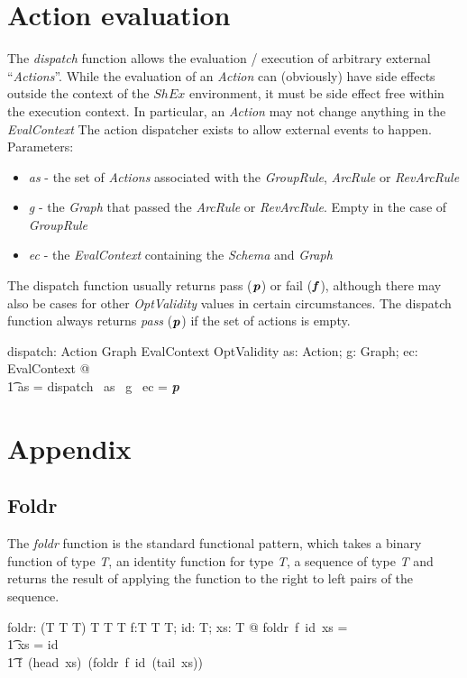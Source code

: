 \documentclass[fuzz]{llncs}
\def\pass{\textbf{\textit{p}}}
\def\fail{\textbf{\textit{f}}}
\def\zc{\textit}
\begin{document}
\section{Action evaluation}
The \zc{dispatch} function allows the evaluation / execution of arbitrary external ``\zc{Actions}''.  While the evaluation of an \zc{Action} can (obviously) have side effects
outside the context of the $ShEx$ environment, it must be side effect free within the 
execution context.  In particular, an \zc{Action} may not change anything in the 
\zc{EvalContext} 
The action dispatcher exists to allow external events to happen. Parameters:
\begin{itemize}
\item \zc{as} - the set of \zc{Actions} associated with the \zc{GroupRule}, \zc{ArcRule} or \zc{RevArcRule} 
\item \zc{g} - the \zc{Graph} that passed the \zc{ArcRule} or \zc{RevArcRule}.  Empty in the case of \zc{GroupRule}
\item \zc{ec} - the \zc{EvalContext} containing the \zc{Schema} and \zc{Graph}

\end{itemize}

The dispatch function usually returns pass ($\pass$) or fail ($\fail$), although there may also be cases for other \zc{OptValidity} values in certain circumstances. The dispatch function
always returns \zc{pass} ($\pass$) if the set of actions is empty.
\begin{zed}
[Action]
\end{zed}
\begin{gendef}
   dispatch: \power Action \fun Graph \fun EvalContext \fun OptValidity
\where
   \forall as: \power Action; g: Graph; ec: EvalContext @ \\
\t1 as = \emptyset \implies dispatch~ as~ g ~ec = \pass
\end{gendef}

\appendix
\section{Appendix}
\subsection{Foldr}
The \zc{foldr} function is the standard functional pattern, which takes a binary function
of type \zc{T}, an identity function for type \zc{T}, a sequence of type \zc{T} and returns
the result of applying the function to the right to left pairs of the sequence.
\begin{gendef}[T]
   foldr: (T \fun T \fun T) \fun T \fun \seq T \fun T
\where
   \forall f:T \fun T \fun T; id: T; xs: \seq T @ foldr~f~id~xs = \\
\t1 \IF xs = \langle \rangle \THEN id \\
\t1 \ELSE f~(head~xs)~(foldr~f~id~(tail~xs))
\end{gendef}
\end{document}
